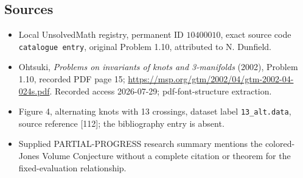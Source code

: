 \documentclass[11pt]{article}
\begin{document}
\subsection{Sources}
\begin{itemize}
\item Local UnsolvedMath registry, permanent ID \(10400010\), exact source code \texttt{catalogue entry}, original Problem 1.10, attributed to N. Dunfield.
\item Ohtsuki, \emph{Problems on invariants of knots and 3-manifolds} (2002), Problem 1.10, recorded PDF page 15; \url{https://msp.org/gtm/2002/04/gtm-2002-04-024s.pdf}. Recorded access 2026-07-29; pdf-font-structure extraction.
\item Figure 4, alternating knots with 13 crossings, dataset label \texttt{13\_alt.data}, source reference [112]; the bibliography entry is absent.
\item Supplied PARTIAL-PROGRESS research summary mentions the colored-Jones Volume Conjecture without a complete citation or theorem for the fixed-evaluation relationship.
\end{itemize}
\end{document}
